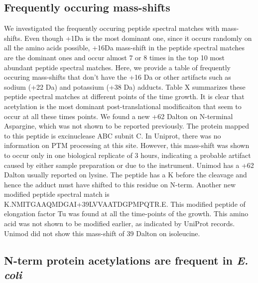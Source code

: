 \documentclass[12pt]{article}
\begin{document}

\subsection{Frequently occuring mass-shifts}
We investigated the frequently occuring peptide spectral matches with mass-shifts. Even though +1Da is the most dominant one, since it occurs randomly on all the amino acids possible, +16Da mass-shift in the peptide spectral matches are the dominant ones and occur almost 7 or 8 times in the top 10 most abundant peptide spectral matches. Here, we provide a table of frequently occuring mass-shifts that don't have the +16 Da or other artifacts such as sodium (+22 Da) and potassium (+38 Da) adducts. Table X summarizes these peptide spectral matches at different points of the time growth. It is clear that acetylation is the most dominant post-translational modificaiton that seem to occur at all these times points. We found a new +62 Dalton on N-terminal Aspargine, which was not shown to be reported previously. The protein mapped to this peptide is excinuclease ABC subnit C. In Uniprot, there was no information on PTM processing at this site. However, this mass-shift was shown to occur only in one biological replicate of 3 hours, indicating a probable artifact caused by either sample preparation or due to the instrument. Unimod has a +62 Dalton usually reported on lysine. The peptide has a K before the cleavage and hence the adduct must have shifted to this residue on N-term. Another new modified peptide spectral match is K.NMITGAAQMDGAI+39LVVAATDGPMPQTR.E. This modified peptide of elongation factor Tu was found at all the time-points of the growth. This amino acid was not shown to be modified earlier, as indicated by UniProt records. Unimod did not show this mass-shift of 39 Dalton on isoleucine.

\subsection{N-term protein acetylations are frequent in \emph{E. coli}}
\end{document}
